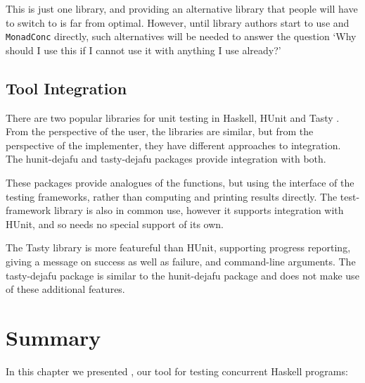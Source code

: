 This is just one library, and providing an alternative library that
people will have to switch to is far from optimal.  However, until
library authors start to use \dejafu{} and \verb|MonadConc| directly,
such alternatives will be needed to answer the question `Why should I
use this if I cannot use it with anything I use already?'

\subsection{Tool Integration}

There are two popular libraries for unit testing in Haskell,
HUnit \parencite{hunit} and Tasty \parencite{tasty}.  From the perspective of the
user, the libraries are similar, but from the perspective of the
implementer, they have different approaches to integration.  The
hunit-dejafu \parencite{hunit_dejafu} and tasty-dejafu \parencite{tasty_dejafu}
packages provide integration with both.

These packages provide analogues of the \dejafu{} functions, but using
the interface of the testing frameworks, rather than computing and
printing results directly.  The test-framework \parencite{test_framework}
library is also in common use, however it supports integration with
HUnit, and so needs no special support of its own.

The Tasty library is more featureful than HUnit, supporting progress
reporting, giving a message on success as well as failure, and
command-line arguments.  The tasty-dejafu package is similar to the
hunit-dejafu package and does not make use of these additional
features.

\vfill\pagebreak
\section{Summary}

In this chapter we presented \dejafu{}, our tool for testing
concurrent Haskell programs:

